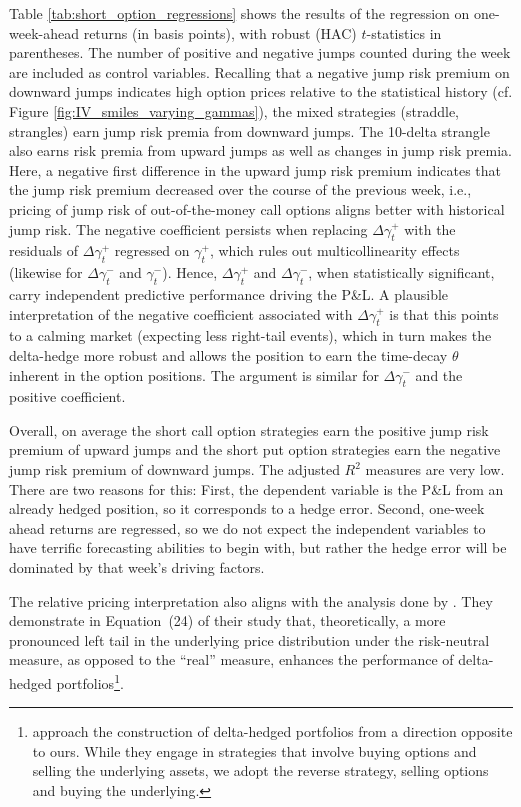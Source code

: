 \documentclass[11pt,a4paper]{article}
\numberwithin{equation}{section}
\theoremstyle{remark}
\theoremstyle{definition}
\begin{document}
Table \ref{tab:short_option_regressions} shows the results of the regression on one-week-ahead returns (in basis points), with robust (HAC) $t$-statistics in parentheses. The number of positive and negative jumps counted during the week are included as control variables. Recalling that a negative jump risk premium on downward jumps indicates high option prices relative to the statistical history (cf. Figure \ref{fig:IV_smiles_varying_gammas}), the mixed strategies (straddle, strangles) earn jump risk premia from downward jumps. The 10-delta strangle also earns risk premia from upward jumps as well as changes in jump risk premia. Here, a negative first difference in the upward jump risk premium indicates that the jump risk premium decreased over the course of the previous week, i.e., pricing of jump risk of out-of-the-money call options aligns better with historical jump risk. The negative coefficient persists when replacing $\Delta\gamma^+_t$ with the residuals of $\Delta\gamma_t^+$ regressed on $\gamma_t^+$, which rules out multicollinearity effects (likewise for $\Delta\gamma_t^-$ and $\gamma_t^-$). Hence, $\Delta\gamma_t^+$ and $\Delta\gamma_t^-$, when statistically significant, carry independent predictive performance driving the P\&L. A plausible interpretation of the negative coefficient associated with $\Delta\gamma_t^+$ is that this points to a calming market (expecting less right-tail events), which in turn makes the delta-hedge more robust and allows the position to earn the time-decay $\theta$ inherent in the option positions. The argument is similar for $\Delta\gamma_t^-$ and the positive coefficient.

Overall, on average the short call option strategies earn the positive jump risk premium of upward jumps and the short put option strategies earn the negative jump risk premium of downward jumps. The adjusted $R^2$ measures are very low. There are two reasons for this: First, the dependent variable is the P\&L from an already hedged position, so it corresponds to a hedge error. Second, one-week ahead returns are regressed, so we do not expect the independent variables to have terrific forecasting abilities to begin with, but rather the hedge error will be dominated by that week's driving factors.

The relative pricing interpretation also aligns with the analysis done by \cite{bakshi2003delta}.
They demonstrate in Equation~(24) of their study that, theoretically, a more pronounced left tail in the underlying price distribution under the risk-neutral measure, as opposed to the ``real'' measure, enhances the performance of delta-hedged portfolios\footnote{\cite{bakshi2003delta} approach the construction of delta-hedged portfolios from a direction opposite to ours. While they engage in strategies that involve buying options and selling the underlying assets, we adopt the reverse strategy, selling options and buying the underlying.}.
\end{document}
